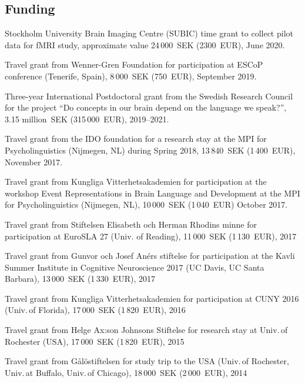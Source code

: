 \documentclass[margin, 11pt]{res} %
\begin{document}
\begin{resume}
\section{\sc Funding}


Stockholm University Brain Imaging Centre (SUBIC) time grant to collect pilot data for fMRI study, approximate value 24\,000~SEK (2300~EUR), June 2020.


Travel grant from Wenner-Gren Foundation for participation at ESCoP conference (Tenerife, Spain), 8\,000~SEK (750~EUR), September 2019.

Three-year International Postdoctoral grant from the Swedish Research Council for the project ``Do concepts in our brain depend on the language we speak?'', 3.15 million~SEK (315\,000~EUR), 2019--2021.

Travel grant from the IDO foundation for a research stay at the MPI for Psycholinguistics (Nijmegen, NL) during Spring 2018, 13\,840~SEK (1\,400~EUR), November 2017.

Travel grant from Kungliga Vitterhetsakademien for participation at the workshop Event Representations in Brain Language and Development at the MPI for Psycholinguistics (Nijmegen, NL), 10\,000~SEK (1\,040~EUR) October 2017.

Travel grant from Stiftelsen Elisabeth och Herman Rhodins minne for participation at EuroSLA 27 (Univ. of Reading), 11\,000~SEK (1\,130~EUR), 2017

Travel grant from Gunvor och Josef An\'{e}rs stiftelse for participation at the Kavli Summer Institute in Cognitive Neuroscience 2017 (UC Davis, UC Santa Barbara), 13\,000~SEK (1\,330~EUR), 2017

Travel grant from Kungliga Vitterhetsakademien for participation at CUNY 2016 (Univ.\,of Florida), 17\,000~SEK (1\,820~EUR), 2016

Travel grant from Helge Ax:son Johnsons Stiftelse for research stay at Univ.\,of Rochester (USA), 17\,000~SEK (1\,820~EUR), 2015

Travel grant from G\aa l\"{o}stiftelsen for study trip to the USA (Univ.\,of Rochester, Univ.\,at Buffalo, Univ.\,of Chicago), 18\,000~SEK (2\,000~EUR), 2014
 





\end{resume}
\end{document}
